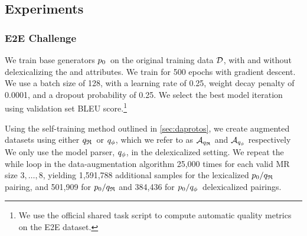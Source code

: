 
\subsection{Experiments}
\subsubsection{E2E Challenge}
 We train base generators $p_0$~on the original training data $\mathcal{D}$, 
 with and without
 delexicalizing the  and  attributes. 
We train for 500 epochs with gradient descent. We use a batch size of 128,
with a learning rate of 0.25, weight decay penalty of 0.0001, and a dropout 
probability of 0.25.
We select the best model iteration using validation
set BLEU score.\footnote{We use the official shared task script to
compute automatic quality metrics on the E2E dataset.}

Using the self-training method outlined in \autoref{sec:daprotos},
we create augmented datasets using either ${q_{\mathfrak{R}} }$~or
${q_{\phi} }$, which we refer to as 
${\mathcal{A}}_{{q_{\mathfrak{R}} }}$ and ${\mathcal{A}}_{{q_{\phi} }}$ respectively 
We only use the model parser, ${q_{\phi} }$, in the delexicalized setting.
We repeat the while loop in the data-augmentation algorithm 
25,000 times for each valid MR size $3,\ldots,8$,
yielding 1,591,788 additional samples for the lexicalized $p_0/{q_{\mathfrak{R}} }$
pairing, and 
501,909 for $p_0/{q_{\mathfrak{R}} }$ and 384,436 for 
$p_0/{q_{\phi} }$~delexicalized pairings.

